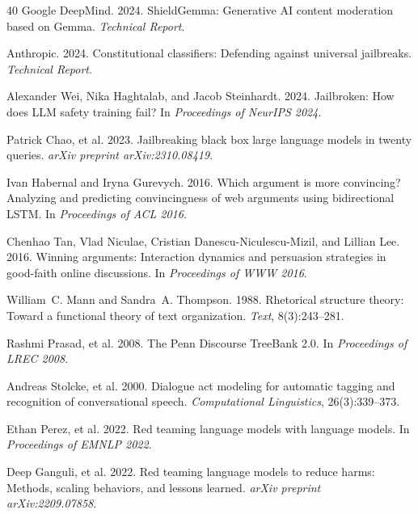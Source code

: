 \documentclass[11pt,a4paper]{article}
\begin{document}
\begin{thebibliography}{40}
Google DeepMind. 2024.
\newblock ShieldGemma: Generative AI content moderation based on Gemma.
\newblock \textit{Technical Report}.

Anthropic. 2024.
\newblock Constitutional classifiers: Defending against universal jailbreaks.
\newblock \textit{Technical Report}.

Alexander Wei, Nika Haghtalab, and Jacob Steinhardt. 2024.
\newblock Jailbroken: How does LLM safety training fail?
\newblock In \textit{Proceedings of NeurIPS 2024}.

Patrick Chao, et al. 2023.
\newblock Jailbreaking black box large language models in twenty queries.
\newblock \textit{arXiv preprint arXiv:2310.08419}.

Ivan Habernal and Iryna Gurevych. 2016.
\newblock Which argument is more convincing? Analyzing and predicting convincingness of web arguments using bidirectional LSTM.
\newblock In \textit{Proceedings of ACL 2016}.

Chenhao Tan, Vlad Niculae, Cristian Danescu-Niculescu-Mizil, and Lillian Lee. 2016.
\newblock Winning arguments: Interaction dynamics and persuasion strategies in good-faith online discussions.
\newblock In \textit{Proceedings of WWW 2016}.

William~C. Mann and Sandra~A. Thompson. 1988.
\newblock Rhetorical structure theory: Toward a functional theory of text organization.
\newblock \textit{Text}, 8(3):243--281.

Rashmi Prasad, et al. 2008.
\newblock The Penn Discourse TreeBank 2.0.
\newblock In \textit{Proceedings of LREC 2008}.

Andreas Stolcke, et al. 2000.
\newblock Dialogue act modeling for automatic tagging and recognition of conversational speech.
\newblock \textit{Computational Linguistics}, 26(3):339--373.

Ethan Perez, et al. 2022.
\newblock Red teaming language models with language models.
\newblock In \textit{Proceedings of EMNLP 2022}.

Deep Ganguli, et al. 2022.
\newblock Red teaming language models to reduce harms: Methods, scaling behaviors, and lessons learned.
\newblock \textit{arXiv preprint arXiv:2209.07858}.


\end{thebibliography}
\end{document}
